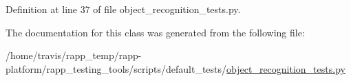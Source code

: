 Definition at line 37 of file object\-\_\-recognition\-\_\-tests.\-py.



The documentation for this class was generated from the following file\-:\begin{DoxyCompactItemize}
\item 
/home/travis/rapp\-\_\-temp/rapp-\/platform/rapp\-\_\-testing\-\_\-tools/scripts/default\-\_\-tests/\hyperlink{object__recognition__tests_8py}{object\-\_\-recognition\-\_\-tests.\-py}\end{DoxyCompactItemize}
